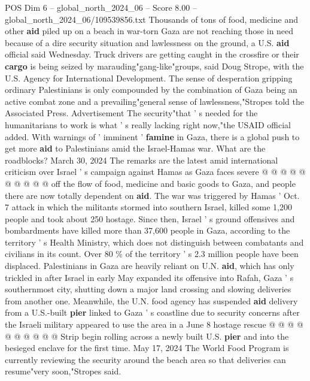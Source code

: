 \begin{textsample}{POS Dim 6 – global\_north\_2024\_06 – Score 8.00 – global\_north\_2024\_06/109539856.txt}  \label{ex:f6_pos_136}
Thousands of tons of food, medicine and other \textbf{aid} piled up on a beach in war-torn Gaza are not reaching those in need because of a dire security situation and lawlessness on the ground, a U.S. \textbf{aid} official said Wednesday.
Truck drivers are getting caught in the crossfire or their \textbf{cargo} is being seized by marauding"gang-like"groups, said Doug Strope, with the U.S.
Agency for International Development.
The sense of desperation gripping ordinary Palestinians is only compounded by the combination of Gaza being an active combat zone and a prevailing"general sense of lawlessness,"Stropes told the Associated Press.
Advertisement The security"that ' s needed for the humanitarians to work is what ' s really lacking right now,"the USAID official added.
With warnings of ' imminent ' \textbf{famine} in Gaza, there is a global push to get more \textbf{aid} to Palestinians amid the Israel-Hamas war.
What are the roadblocks?
March 30, 2024 The remarks are the latest amid international criticism over Israel ' s campaign against Hamas as Gaza faces severe @ @ @ @ @ @ @ @ @ @ off the flow of food, medicine and basic goods to Gaza, and people there are now totally dependent on \textbf{aid}.
The war was triggered by Hamas ' Oct. 7 attack in which the militants stormed into southern Israel, killed some 1,200 people and took about 250 hostage.
Since then, Israel ' s ground offensives and bombardments have killed more than 37,600 people in Gaza, according to the territory ' s Health Ministry, which does not distinguish between combatants and civilians in its count.
Over 80 \% of the territory ' s 2.3 million people have been displaced.
Palestinians in Gaza are heavily reliant on U.N. \textbf{aid}, which has only trickled in after Israel in early May expanded its offensive into Rafah, Gaza ' s southernmost city, shutting down a major land crossing and slowing deliveries from another one.
Meanwhile, the U.N. food agency has suspended \textbf{aid} delivery from a U.S.-built \textbf{pier} linked to Gaza ' s coastline due to security concerns after the Israeli military appeared to use the area in a June 8 hostage rescue @ @ @ @ @ @ @ @ @ @ Strip begin rolling across a newly built U.S. \textbf{pier} and into the besieged enclave for the first time.
May 17, 2024 The World Food Program is currently reviewing the security around the beach area so that deliveries can resume"very soon,"Stropes said.

\end{textsample}
